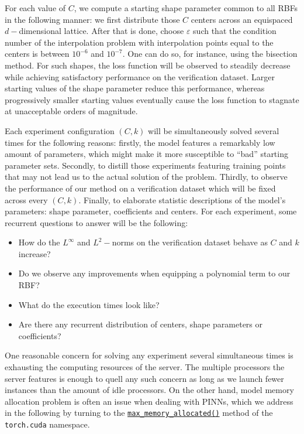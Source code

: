 \documentclass[12pt]{report} %
\begin{document}
For each value of $C$, we compute a starting shape parameter common to all RBFs in the following manner: we first distribute those $C$ centers across an equispaced $d-$dimensional lattice. After that is done, choose $\varepsilon$ such that the condition number of the interpolation problem with interpolation points equal to the centers is between $10^{-6}$ and $10^{-7}$. One can do so, for instance, using the bisection method. For such shapes, the loss function will be observed to steadily decrease while achieving satisfactory performance on the verification dataset. Larger starting values of the shape parameter reduce this performance, whereas progressively smaller starting values eventually cause the loss function to stagnate at unacceptable orders of magnitude.

Each experiment configuration $(C,k)$ will be simultaneously solved several times for the following reasons: firstly, the model features a remarkably low amount of parameters, which might make it more susceptible to ``bad'' starting parameter sets. Secondly, to distill those experiments featuring training points that may not lead us to the actual solution of the problem. Thirdly, to observe the performance of our method on a verification dataset which will be fixed across every $(C,k)$. Finally, to elaborate statistic descriptions of the model's parameters: shape parameter, coefficients and centers. For each experiment, some recurrent questions to answer will be the following:

\begin{itemize}
  \item How do the $L^\infty$ and $L^2-$norms on the verification dataset behave as $C$ and $k$ increase?
  \item Do we observe any improvements when equipping a polynomial term to our RBF?
  \item What do the execution times look like? %
  \item Are there any recurrent distribution of centers, shape parameters or coefficients?
\end{itemize}

One reasonable concern for solving any experiment several simultaneous times is exhausting the computing resources of the server. The multiple processors the server features is enough to quell any such concern as long as we launch fewer instances than the amount of idle processors. On the other hand, model memory allocation problem is often an issue when dealing with PINNs, which we address in the following by turning to the \href{https://pytorch.org/docs/stable/generated/torch.cuda.max_memory_allocated.html}{\texttt{max\_memory\_allocated()}}
method of the \texttt{torch.cuda} namespace.
\end{document}
